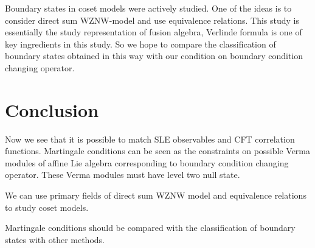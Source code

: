 \documentclass[12pt]{article}
\theoremstyle{definition}
\theoremstyle{definition} \newtheorem{Def}{Definition}
\begin{document}
Boundary states in coset models were actively studied. One of the ideas is to consider direct sum WZNW-model and use equivalence relations. This study is essentially the study representation of fusion algebra, Verlinde formula is one of key ingredients in this study. So we hope to compare the classification of boundary states obtained in this way with our condition on boundary condition changing operator. 

\section{Conclusion}
\label{sec:conclusion}

Now we see that it is possible to match SLE observables and CFT correlation functions. Martingale conditions can be seen as the constraints on possible Verma modules of affine Lie algebra corresponding to boundary condition changing operator. These Verma modules must have level two null state. 

We can use primary fields of direct sum WZNW model and equivalence relations to study coset models. 

Martingale conditions should be compared with the classification of boundary states with other methods.

{}

\end{document}
